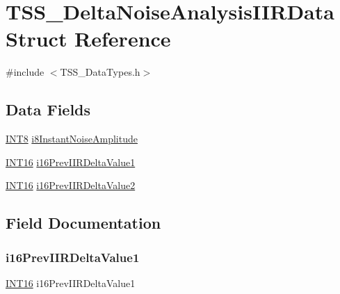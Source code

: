\hypertarget{struct_t_s_s___delta_noise_analysis_i_i_r_data}{}\section{T\+S\+S\+\_\+\+Delta\+Noise\+Analysis\+I\+I\+R\+Data Struct Reference}
\label{struct_t_s_s___delta_noise_analysis_i_i_r_data}


{\ttfamily \#include $<$T\+S\+S\+\_\+\+Data\+Types.\+h$>$}

\subsection*{Data Fields}
\begin{DoxyCompactItemize}
\item 
\hyperlink{_t_s_s___data_types_8h_a7ebe70ceca856797319175e30bcf003d}{I\+N\+T8} \hyperlink{struct_t_s_s___delta_noise_analysis_i_i_r_data_a734295befe61f12b78a70bcb2adee84c}{i8\+Instant\+Noise\+Amplitude}
\item 
\hyperlink{_t_s_s___data_types_8h_a57de7cb8e702b1746127a4d5137fa455}{I\+N\+T16} \hyperlink{struct_t_s_s___delta_noise_analysis_i_i_r_data_af076d78e9bd9d2ccdc83ff970f74b085}{i16\+Prev\+I\+I\+R\+Delta\+Value1}
\item 
\hyperlink{_t_s_s___data_types_8h_a57de7cb8e702b1746127a4d5137fa455}{I\+N\+T16} \hyperlink{struct_t_s_s___delta_noise_analysis_i_i_r_data_ae1e4cd96e14fa78a04e4810a3ddb7290}{i16\+Prev\+I\+I\+R\+Delta\+Value2}
\end{DoxyCompactItemize}


\subsection{Field Documentation}
\mbox{\label{struct_t_s_s___delta_noise_analysis_i_i_r_data_af076d78e9bd9d2ccdc83ff970f74b085}} 
\subsubsection{\texorpdfstring{i16\+Prev\+I\+I\+R\+Delta\+Value1}{i16PrevIIRDeltaValue1}}
{\footnotesize\ttfamily \hyperlink{_t_s_s___data_types_8h_a57de7cb8e702b1746127a4d5137fa455}{I\+N\+T16} i16\+Prev\+I\+I\+R\+Delta\+Value1}

